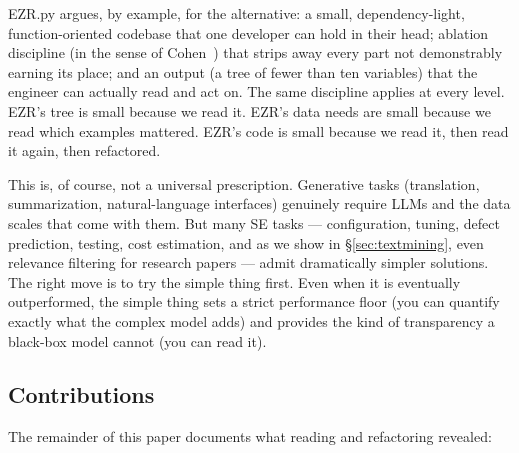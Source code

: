 \documentclass[AMA,STIX2COL]{WileyNJDv5}
\begin{document}
EZR.py argues, by example, for the alternative: a small,
dependency-light, function-oriented codebase that one developer
can hold in their head; ablation discipline (in the sense of
Cohen~\cite{cohen1995}) that strips away every part not
demonstrably earning its place; and an output (a tree of fewer
than ten variables) that the engineer can actually read and act
on. The same discipline applies at every level. EZR's tree is
small because we read it. EZR's data needs are small because we
read which examples mattered. EZR's code is small because we
read it, then read it again, then refactored.

This is, of course, not a universal prescription. Generative
tasks (translation, summarization, natural-language interfaces)
genuinely require LLMs and the data scales that come with them.
But many SE tasks — configuration, tuning, defect prediction,
testing, cost estimation, and as we show in
\S\ref{sec:textmining}, even relevance filtering for research
papers — admit dramatically simpler solutions. The right move
is to try the simple thing first. Even when it is eventually
outperformed, the simple thing sets a strict performance floor
(you can quantify exactly what the complex model adds) and
provides the kind of transparency a black-box model cannot
(you can read it).

\subsection*{Contributions}

The remainder of this paper documents what reading and
refactoring revealed:
\end{document}
